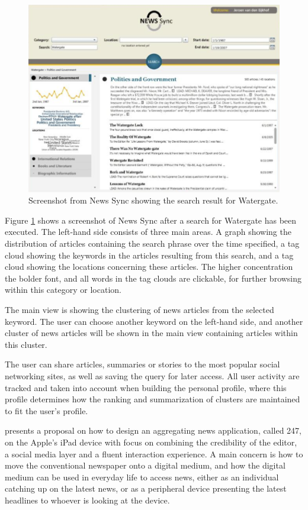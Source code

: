 \begin{figure}[!htbp]
\centering
\includegraphics[width=140mm]{GFX/screenshots/newsSyncSearchWatergate.png}
\caption{Screenshot from News Sync showing the search result for Watergate.}
\label{news_sync_schematic_diagram}
\end{figure}

Figure \ref{news_sync_schematic_diagram} shows a screenshot of News Sync after a search for Watergate has been executed. The left-hand side consists of three main areas. A graph showing the distribution of articles containing the search phrase over the time specified, a tag cloud showing the keywords in the articles resulting from this search, and a tag cloud showing the locations concerning these articles. The higher concentration the bolder font, and all words in the tag clouds are clickable, for further browsing within this category or location.

The main view is showing the clustering of news articles from the selected keyword. The user can choose another keyword on the left-hand side, and another cluster of news articles will be shown in the main view containing articles within this cluster.

The user can share articles, summaries or stories to the most popular social networking sites, as well as saving the query for later access. All user activity are tracked and taken into account when building the personal profile, where this profile determines how the ranking and summarization of clusters are maintained to fit the user's profile.


\cite{anna2011designing} presents a proposal on how to design an aggregating news application, called 247, on the Apple's iPad device with focus on combining the credibility of the editor, a social media layer and a fluent interaction experience. A main concern is how to move the conventional newspaper onto a digital medium, and how the digital medium can be used in everyday life to access news, either as an individual catching up on the latest news, or as a peripheral device presenting the latest headlines to whoever is looking at the device.

